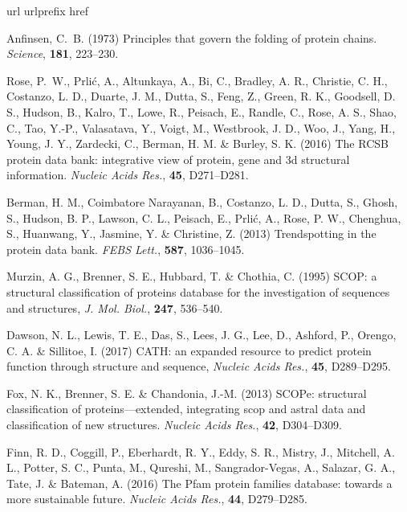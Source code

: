 \documentclass[a4paper,numbib, final, twoside, titelpage]{imaiai}%
\begin{document}
\vspace{3em}
\begin{references} %
\expandafter\ifx\csname url\endcsname\relax
  \def\url#1{\texttt{#1}}\fi
\expandafter\ifx\csname urlprefix\endcsname\relax\def\urlprefix{URL }\fi
\expandafter\ifx\csname href\endcsname\relax
  \def\href#1#2{#2} \def\path#1{#1}\fi

{\sc  Anfinsen, C.~B.} (1973) Principles that govern the folding of protein chains. \textit{Science},
  \textbf{181},  223--230.

{\sc Rose, P.~W., Prli{\'c}, A., Altunkaya, A., Bi, C., Bradley, A. R., Christie, C. H.,
  Costanzo, L. D., Duarte, J. M., Dutta, S., Feng, Z., Green, R. K., Goodsell, D. S., Hudson, B., Kalro, T., Lowe, R., Peisach, E., Randle, C., Rose, A. S., Shao, C., Tao, Y.-P., Valasatava, Y., Voigt, M., Westbrook, J. D., Woo, J., Yang, H., Young, J. Y., Zardecki, C., Berman, H. M. \& Burley, S. K.} (2016) The {RCSB} protein
  data bank: integrative view of protein, gene and 3d structural information.
  \textit{Nucleic Acids Res.}, \textbf{45}, D271--D281.

{\sc Berman, H. M., Coimbatore Narayanan, B., Costanzo, L. D., Dutta, S., Ghosh, S.,
  Hudson, B. P., Lawson, C. L., Peisach, E., Prli{\'c}, A., Rose, P. W., Chenghua, S., Huanwang, Y., Jasmine, Y. \& Christine, Z.} (2013)
  Trendspotting in the protein data bank. \textit{FEBS Lett.}, {\bf 587}, 1036--1045.

{\sc Murzin, A. G., Brenner, S. E., Hubbard, T. \& Chothia, C.} (1995) {SCOP}: a structural
  classification of proteins database for the investigation of sequences and
  structures, \textit{J. Mol. Biol.}, {\bf 247}, 536--540.

{\sc Dawson, N. L., Lewis, T. E., Das, S., Lees, J. G., Lee, D., Ashford, P.,
  Orengo, C. A. \& Sillitoe, I.} (2017) {CATH}: an expanded resource to predict protein function
  through structure and sequence, \textit{Nucleic Acids Res.}, {\bf 45},
  D289--D295.

{\sc Fox, N. K., Brenner, S. E. \& Chandonia, J.-M.} (2013) {SCOPe}: structural classification
  of proteins---extended, integrating scop and astral data and classification
  of new structures. \textit{Nucleic Acids Res.}, \textbf{42}, D304--D309.

{\sc Finn, R. D., Coggill, P., Eberhardt, R. Y., Eddy, S. R., Mistry, J., Mitchell, A. L.,
  Potter, S. C., Punta, M., Qureshi, M., Sangrador-Vegas, A., Salazar, G. A.,
  Tate, J. \& Bateman, A.} (2016) The {Pfam} protein families database: towards a more
  sustainable future. \textit{Nucleic Acids Res.}, {\bf 44}, D279--D285.


\end{references}
\end{document}

